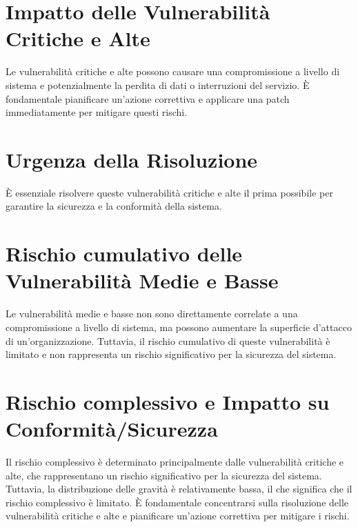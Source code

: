 \section{Impatto delle Vulnerabilità Critiche e Alte}

Le vulnerabilità critiche e alte possono causare una compromissione a livello di sistema e potenzialmente la perdita di dati o interruzioni del servizio. È fondamentale pianificare un'azione correttiva e applicare una patch immediatamente per mitigare questi rischi.

\section{Urgenza della Risoluzione}

È essenziale risolvere queste vulnerabilità critiche e alte il prima possibile per garantire la sicurezza e la conformità della sistema.

\section{Rischio cumulativo delle Vulnerabilità Medie e Basse}

Le vulnerabilità medie e basse non sono direttamente correlate a una compromissione a livello di sistema, ma possono aumentare la superficie d'attacco di un'organizzazione. Tuttavia, il rischio cumulativo di queste vulnerabilità è limitato e non rappresenta un rischio significativo per la sicurezza del sistema.

\section{Rischio complessivo e Impatto su Conformità/Sicurezza}

Il rischio complessivo è determinato principalmente dalle vulnerabilità critiche e alte, che rappresentano un rischio significativo per la sicurezza del sistema. Tuttavia, la distribuzione delle gravità è relativamente bassa, il che significa che il rischio complessivo è limitato. È fondamentale concentrarsi sulla risoluzione delle vulnerabilità critiche e alte e pianificare un'azione correttiva per mitigare i rischi.



